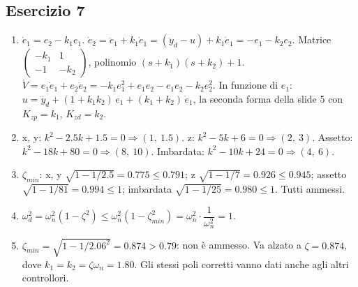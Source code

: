 \documentclass[11pt,a4paper]{article}
\begin{document}
\subsection*{Esercizio 7}
\begin{enumerate}[label=(\alph*)]
  \item $\dot e_1 = e_2 - k_1 e_1$. $\dot e_2 = \ddot e_1 + k_1\dot e_1 = (\ddot y_d - u) + k_1\dot e_1 = -e_1 - k_2 e_2$. Matrice $\begin{pmatrix} -k_1 & 1 \\ -1 & -k_2 \end{pmatrix}$, polinomio $(s + k_1)(s + k_2) + 1$. $\dot V = e_1\dot e_1 + e_2\dot e_2 = -k_1 e_1^2 + e_1e_2 - e_1e_2 - k_2e_2^2$. In funzione di $e_1$: $u = \ddot y_d + (1 + k_1k_2)\,e_1 + (k_1 + k_2)\,\dot e_1$, la seconda forma della slide 5 con $K_{zp} = k_1$, $K_{zd} = k_2$.
  \item x, y: $k^2 - 2.5k + 1.5 = 0 \Rightarrow (1,\ 1.5)$. z: $k^2 - 5k + 6 = 0 \Rightarrow (2,\ 3)$. Assetto: $k^2 - 18k + 80 = 0 \Rightarrow (8,\ 10)$. Imbardata: $k^2 - 10k + 24 = 0 \Rightarrow (4,\ 6)$.
  \item $\zeta_{min}$: x, y $\sqrt{1 - 1/2.5} = 0.775 \le 0.791$; z $\sqrt{1 - 1/7} = 0.926 \le 0.945$; assetto $\sqrt{1 - 1/81} = 0.994 \le 1$; imbardata $\sqrt{1 - 1/25} = 0.980 \le 1$. Tutti ammessi.
  \item $\omega_d^2 = \omega_n^2(1 - \zeta^2) \le \omega_n^2(1 - \zeta_{min}^2) = \omega_n^2 \cdot \dfrac{1}{\omega_n^2} = 1$.
  \item $\zeta_{min} = \sqrt{1 - 1/2.06^2} = 0.874 > 0.79$: non è ammesso. Va alzato a $\zeta = 0.874$, dove $k_1 = k_2 = \zeta\omega_n = 1.80$. Gli stessi poli corretti vanno dati anche agli altri controllori.
\end{enumerate}
\end{document}
